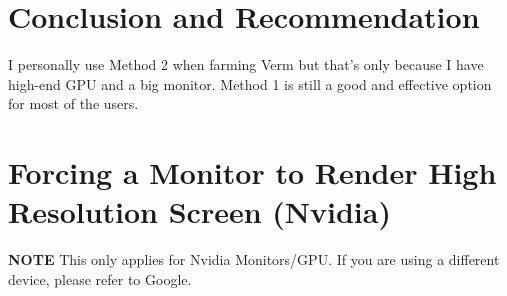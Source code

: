 \documentclass{article}
\begin{document}
\section{Conclusion and Recommendation}

I personally use Method 2 when farming Verm but that's only because I have high-end GPU and a big monitor. Method 1 is still a good and effective option for most of the users. 

\appendix
\appendixpage
\addappheadtotoc

\section{Forcing a Monitor to Render High Resolution Screen (Nvidia)}
\label{appenfix: monitor}

\textbf{NOTE} This only applies for Nvidia Monitors/GPU. If you are using a different device, please refer to Google.
\end{document}
